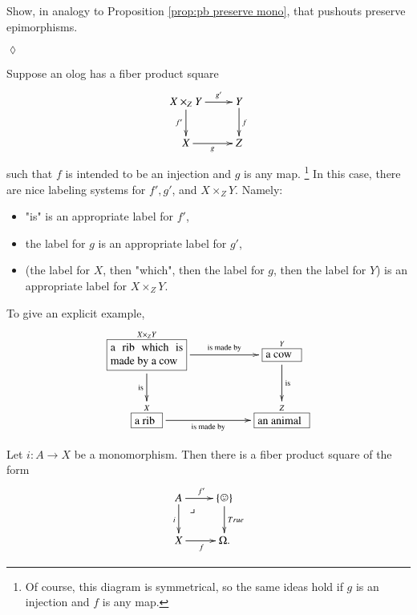 \documentclass{book}
\makeatletter
\def\tn{\textnormal}
\def\singleton{\{\smiley\}}
\def\to{\rightarrow}
\def\taking{\colon}
\newcommand{\LA}[2]{\ar[#1]^-{\tn {#2}}}
\newcommand{\LAL}[2]{\ar[#1]_-{\tn {#2}}}
\newcommand{\obox}[3]{\stackrel{#1}{\fbox{\parbox{#2}{#3}}}}
\def\ullimit{\ar@{}[rd]|(.3)*+{\lrcorner}}
\theoremstyle{theoremENG}
\theoremstyle{lemmaENG}
\theoremstyle{propositionENG}
\theoremstyle{corollaryENG}
\newtheorem{corollaryENG}[subsubsection]{\begin{english}Corollary\end{english}}
\theoremstyle{factENG}
\theoremstyle{remarkENG}
\theoremstyle{exampleENG}
\newtheorem{exampleENG}[subsubsection]{\begin{english}Example\end{english}}
\theoremstyle{warningENG}
\theoremstyle{questionENG}
\theoremstyle{guessENG}
\theoremstyle{answerENG}
\theoremstyle{constructionENG}
\theoremstyle{rulesENG}
\theoremstyle{excENG}
\newtheorem{excENG}[subsubsection]{\begin{english}Exercise\end{english}}
\theoremstyle{appENG}
\theoremstyle{definitionENG}
\theoremstyle{notationENG}
\theoremstyle{conjectureENG}
\theoremstyle{postulateENG}
\newenvironment{exerciseENG}{\begin{excENG}}{\hspace*{\fill}$\lozenge$\end{excENG}}
\theoremstyle{theoremRUS}
\theoremstyle{lemmaRUS}
\theoremstyle{propositionRUS}
\theoremstyle{corollaryRUS}
\theoremstyle{factRUS}
\theoremstyle{remarkRUS}
\theoremstyle{exampleRUS}
\theoremstyle{warningRUS}
\theoremstyle{questionRUS}
\theoremstyle{guessRUS}
\theoremstyle{answerRUS}
\theoremstyle{constructionRUS}
\theoremstyle{rulesRUS}
\theoremstyle{excRUS}
\theoremstyle{appRUS}
\theoremstyle{definitionRUS}
\theoremstyle{notationRUS}
\theoremstyle{conjectureRUS}
\theoremstyle{postulateRUS}
\makeatother
\begin{document}
\begin{english}
\begin{exerciseENG}

Show, in analogy to Proposition \ref{prop:pb preserve mono}, that pushouts preserve epimorphisms.

\begin{russian} \end{russian}

\end{exerciseENG}

\begin{exampleENG}\label{exc:olog pullbacks}

Suppose an olog has a fiber product square
$$\xymatrix{X\times_ZY\ar[r]^-{g'}\ar[d]_{f'}&Y\ar[d]^f\\X\ar[r]_g&Z}$$ such that $f$ is intended to be an injection and $g$ is any map.
\footnote{Of course, this diagram is symmetrical, so the same ideas hold if $g$ is an injection and $f$ is any map.} 
In this case, there are nice labeling systems for $f', g'$, and $X\times_ZY$. Namely:
\begin{itemize}
\item "is" is an appropriate label for $f'$, 
\item the label for $g$ is an appropriate label for $g'$,
\item (the label for $X$, then "which", then the label for $g$, then the label for $Y$) is an appropriate label for $X\times_ZY$.
\end{itemize}

\begin{russian} \end{russian}

To give an explicit example, 
$$\xymatrix{
\obox{X\times_ZY}{.9in}{a rib which is made by a cow}\LA{rr}{is made by}\LAL{d}{is}&&\obox{Y}{.4in}{a cow}\LA{d}{is}\\
\obox{X}{.3in}{a rib}\LAL{rr}{is made by}&&\obox{Z}{.6in}{an animal}
}
$$

\begin{russian} \end{russian}

\end{exampleENG}

\begin{corollaryENG}\label{cor:monos are pullbacks of true}

Let $i\taking A\to X$ be a monomorphism. Then there is a fiber product square of the form 
\begin{align}\label{dia:monos are pbs of true}
\xymatrix{A\ar[r]^{f'}\ar[d]_i\ullimit&\singleton\ar[d]^{True}\\X\ar[r]_f&\Omega.}
\end{align}


\end{corollaryENG}
\end{english}
\end{document}
